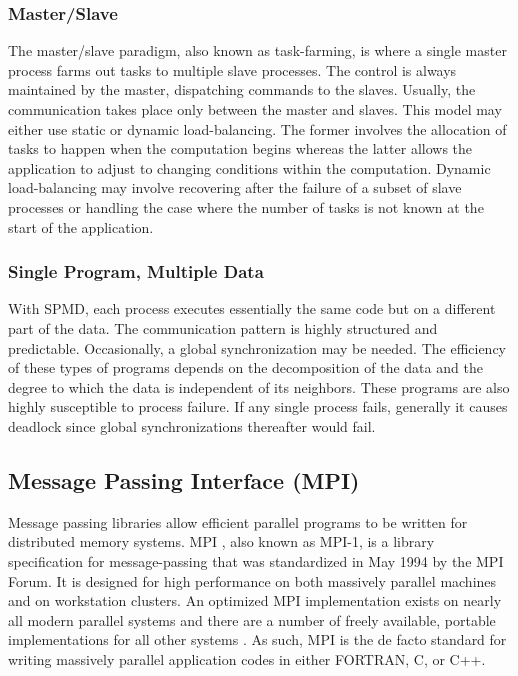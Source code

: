 \documentclass[preprint]{sigplanconf}
\begin{document}
\subsubsection{Master/Slave}

The master/slave paradigm, also known as task-farming, is where a single
master process farms out tasks to multiple slave processes. The control is
always maintained by the master, dispatching commands to the slaves. Usually,
the communication takes place only between the master and slaves. This model
may either use static or dynamic load-balancing. The former involves the
allocation of tasks to happen when the computation begins whereas the latter
allows the application to adjust to changing conditions within the
computation. Dynamic load-balancing may involve recovering after the failure
of a subset of slave processes or handling the case where the number of tasks
is not known at the start of the application.

\subsubsection{Single Program, Multiple Data}

With SPMD, each process executes essentially the same code but on a different
part of the data. The communication pattern is highly structured and
predictable.  Occasionally, a global synchronization may be needed. The
efficiency of these types of programs depends on the decomposition of the data
and the degree to which the data is independent of its neighbors. These
programs are also highly susceptible to process failure.  If any single
process fails, generally it causes deadlock since global synchronizations
thereafter would fail.

\subsection{Message Passing Interface (MPI)}

Message passing libraries allow efficient parallel programs to be written for
distributed memory systems. MPI \cite{Gro99a}, also known as MPI-1, is a
library specification for message-passing that was standardized in May 1994 by
the MPI Forum. It is designed for high performance on both massively parallel
machines and on workstation clusters. An optimized MPI implementation exists
on nearly all modern parallel systems and there are a number of freely
available, portable implementations for all other systems \cite{Buy99}.  As
such, MPI is the de facto standard for writing massively parallel application
codes in either FORTRAN, C, or C++.
\end{document}
